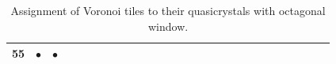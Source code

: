 \documentclass[text.tex]{subfiles}
\begin{document}
\begin{table}
{\begin{tabular}{l|cccccccccccccccccccccccccc}
55  & $\bullet$ & $\bullet$ &           &           &           &           &           &           &           &           &           &           &           &           &           &           &           &           &           &           &           &           &           &           &           \\
\bottomrule
\end{tabular}}
\caption{Assignment of Voronoi tiles to their quasicrystals with octagonal window. }
\label{tab_tiles1}
\end{table}

\restoregeometry
\end{document}
